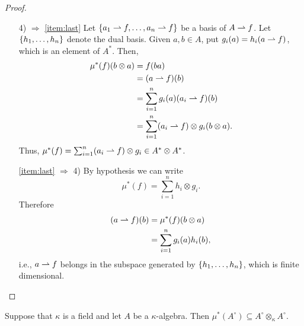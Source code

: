 \begin{proof}
\begin{enumerate}
        \item[4)]$\Rightarrow$ \ref{item:last} Let $\{a_1\rightharpoonup f,\dots,a_n\rightharpoonup f\}$ be a basis of $A\rightharpoonup f$. Let $\{h_1,\dots,h_n\}$ denote the dual basis. Given $a,b\in A$, put $g_i(a) = h_i(a\rightharpoonup f)$, which is an element of $A^*$. Then,
        \begin{align*}
            \mu^*(f)(b\otimes a) &= f(ba)\\
                &= (a\rightharpoonup f)(b)\\
                &= \sum_{i=1}^ng_i(a)(a_i\rightharpoonup f)(b)\\
                &= \sum_{i=1}^n(a_i\rightharpoonup f)\otimes g_i(b\otimes a).
        \end{align*}
        Thus, $\mu^*(f)= \sum_{i=1}^n(a_i\rightharpoonup f)\otimes g_i\in A^*\otimes A^*$.

        \item[\ref{item:last}]$\Rightarrow$ 4) By hypothesis we can write
        $$
            \mu^*(f) = \sum_{i=1}^nh_i\otimes g_i.
        $$
        Therefore
        \begin{align*}
            (a\rightharpoonup f)(b) &= \mu^*(f)(b\otimes a)\\
                &= \sum_{i=1}^ng_i(a)h_i(b),
        \end{align*}
        i.e., $a\rightharpoonup f$ belongs in the subspace generated by $\{h_1,\dots,h_n\}$, which is finite dimensional.
    \end{enumerate}
\end{proof}

\begin{cor}
    Suppose that $\kappa$ is a field and let $A$ be a $\kappa$-algebra. Then $\mu^*(A^\circ)\subseteq A^\circ\otimes_\kappa A^\circ$.
\end{cor}

